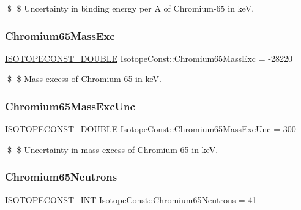 \$ \$ Uncertainty in binding energy per A of Chromium-\/65 in keV. \mbox{\label{group___isotope_const-_chromium-_cr65_ga5904a9e5ccf9bba7eed3dab5ec0e9135}} 
\subsubsection{\texorpdfstring{Chromium65\+Mass\+Exc}{Chromium65MassExc}}
{\footnotesize\ttfamily \mbox{\hyperlink{group___isotope_const-_macros_ga8f45a7272ce02c0b4c65c44636ed719a}{I\+S\+O\+T\+O\+P\+E\+C\+O\+N\+S\+T\+\_\+\+D\+O\+U\+B\+LE}} Isotope\+Const\+::\+Chromium65\+Mass\+Exc = -\/28220}

\$ \$ Mass excess of Chromium-\/65 in keV. \mbox{\label{group___isotope_const-_chromium-_cr65_gacabe0ecd9b92e6bba7761bc341539d3f}} 
\subsubsection{\texorpdfstring{Chromium65\+Mass\+Exc\+Unc}{Chromium65MassExcUnc}}
{\footnotesize\ttfamily \mbox{\hyperlink{group___isotope_const-_macros_ga8f45a7272ce02c0b4c65c44636ed719a}{I\+S\+O\+T\+O\+P\+E\+C\+O\+N\+S\+T\+\_\+\+D\+O\+U\+B\+LE}} Isotope\+Const\+::\+Chromium65\+Mass\+Exc\+Unc = 300}

\$ \$ Uncertainty in mass excess of Chromium-\/65 in keV. \mbox{\label{group___isotope_const-_chromium-_cr65_gaea658fe51a04db4c70cce9ae8e347965}} 
\subsubsection{\texorpdfstring{Chromium65\+Neutrons}{Chromium65Neutrons}}
{\footnotesize\ttfamily \mbox{\hyperlink{group___isotope_const-_macros_ga5f18360b3e99483a35c32d789e62621c}{I\+S\+O\+T\+O\+P\+E\+C\+O\+N\+S\+T\+\_\+\+I\+NT}} Isotope\+Const\+::\+Chromium65\+Neutrons = 41}

